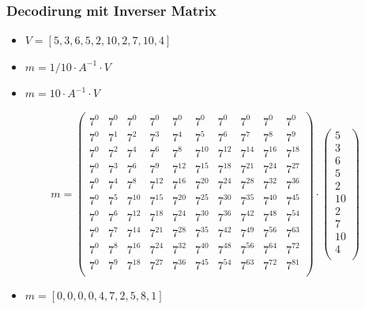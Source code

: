 \documentclass[11pt,aspectratio=169]{beamer}
\begin{document}
	\begin{frame}
		\frametitle{Decodirung mit Inverser Matrix}	
		
		\begin{itemize}
			\item $V = [5,3,6,5,2,10,2,7,10,4]$
			
			\item $m = 1/10 \cdot A^{-1} \cdot V$
			
			\item $m = 10 \cdot A^{-1} \cdot V$
			
		\end{itemize}
		
		\[
		m = \begin{pmatrix}
			7^0&    7^0&    7^0&    7^0&    7^0&    7^0&    7^0&    7^0&    7^0&    7^0\\
			7^0&	7^1&	7^2&	7^3&	7^4&	7^5&	7^6&	7^7&    7^8&	7^9\\
			7^0&	7^2&	7^4&	7^6&	7^8& 7^{10}& 7^{12}& 7^{14}& 7^{16}& 7^{18}\\
			7^0&	7^3&	7^6&	7^9& 7^{12}& 7^{15}& 7^{18}& 7^{21}& 7^{24}& 7^{27}\\
			7^0&	7^4&	7^8& 7^{12}& 7^{16}& 7^{20}& 7^{24}& 7^{28}& 7^{32}& 7^{36}\\
			7^0&	7^5& 7^{10}& 7^{15}& 7^{20}& 7^{25}& 7^{30}& 7^{35}& 7^{40}& 7^{45}\\
			7^0&	7^6& 7^{12}& 7^{18}& 7^{24}& 7^{30}& 7^{36}& 7^{42}& 7^{48}& 7^{54}\\
			7^0&	7^7& 7^{14}& 7^{21}& 7^{28}& 7^{35}& 7^{42}& 7^{49}& 7^{56}& 7^{63}\\
			7^0&	7^8& 7^{16}& 7^{24}& 7^{32}& 7^{40}& 7^{48}& 7^{56}& 7^{64}& 7^{72}\\
			7^0&	7^9& 7^{18}& 7^{27}& 7^{36}& 7^{45}& 7^{54}& 7^{63}& 7^{72}& 7^{81}\\
		\end{pmatrix}
		\cdot
		\begin{pmatrix}
			5 \\ 3 \\ 6 \\ 5 \\ 2 \\ 10 \\ 2 \\ 7 \\ 10 \\ 4 \\
		\end{pmatrix}
		\]
		
		\begin{itemize}
			\item $m = [0,0,0,0,4,7,2,5,8,1]$
		\end{itemize}
		
	\end{frame}
\end{document}
